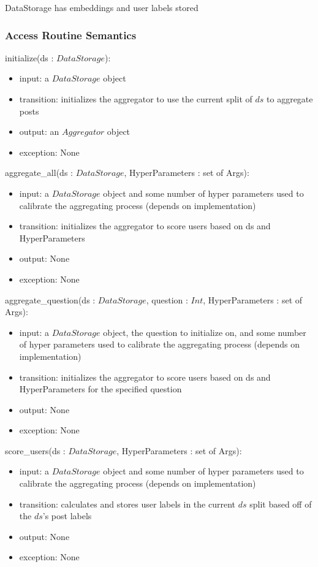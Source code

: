 \documentclass[12pt, titlepage]{article}
\begin{document}
DataStorage has embeddings and user labels stored

\subsubsection{Access Routine Semantics}

\noindent initialize(ds : $DataStorage$):
\begin{itemize}
\item input: a $DataStorage$ object
\item transition: initializes the aggregator to use the current split of $ds$ to aggregate posts
\item output: an $Aggregator$ object
\item exception: None
\end{itemize}

\noindent aggregate\_all(ds : $DataStorage$, HyperParameters : set of Args):
\begin{itemize}
\item input: a $DataStorage$ object and some number of hyper parameters used to calibrate the aggregating process (depends on implementation)
\item transition: initializes the aggregator to score users based on ds and HyperParameters
\item output: None
\item exception: None
\end{itemize}

\noindent aggregate\_question(ds : $DataStorage$, question : $Int$, HyperParameters : set of Args):
\begin{itemize}
\item input: a $DataStorage$ object, the question to initialize on, and some number of hyper parameters used to calibrate the aggregating process (depends on implementation)
\item transition: initializes the aggregator to score users based on ds and HyperParameters for the specified question
\item output: None
\item exception: None
\end{itemize}

\noindent score\_users(ds : $DataStorage$, HyperParameters : set of Args):
\begin{itemize}
\item input: a $DataStorage$ object and some number of hyper parameters used to calibrate the aggregating process (depends on implementation)
\item transition: calculates and stores user labels in the current $ds$ split based off of the $ds$'s post labels
\item output: None
\item exception: None
\end{itemize}
\end{document}
